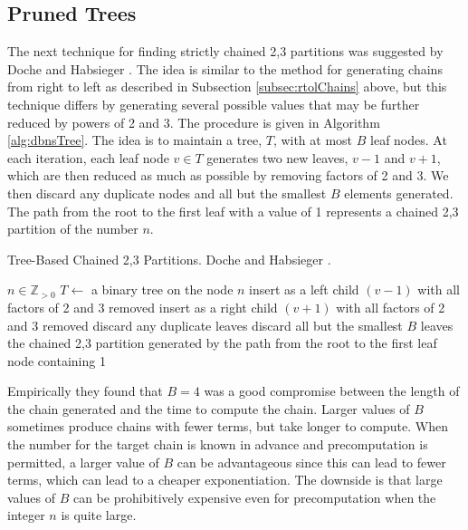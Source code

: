 \documentclass{ucalgthes1}
\theoremstyle{definition}
\newcommand{\ZZgtz}{\mathbb{Z}_{>0}}
\begin{document}
\bigbreak
\subsection{Pruned Trees}

The next technique for finding strictly chained 2,3 partitions was suggested by Doche and Habsieger \cite{Doche2008}. The idea is similar to the method for generating chains from right to left as described in Subsection \ref{subsec:rtolChains} above, but this technique differs by generating several possible values that may be further reduced by powers of 2 and 3. The procedure is given in Algorithm \ref{alg:dbnsTree}.  The idea is to maintain a tree, $T$, with at most $B$ leaf nodes. At each iteration, each leaf node $v \in T$ generates two new leaves, $v-1$ and $v+1$, which are then reduced as much as possible by removing factors of 2 and 3.  We then discard any duplicate nodes and all but the smallest $B$ elements generated. The path from the root to the first leaf with a value of 1 represents a chained 2,3 partition of the number $n$.

\begin{algorithm}[h]
\caption{Tree-Based Chained 2,3 Partitions. Doche and Habsieger \cite{Doche2008}.}
\label{alg:dbnsTree}
\begin{algorithmic}[1]
\REQUIRE $n \in \ZZgtz$
\STATE $T \gets$ a binary tree on the node $n$
		\STATE insert as a left child $(v - 1)$ with all factors of 2 and 3 removed
		\STATE insert as a right child $(v + 1)$ with all factors of 2 and 3 removed
	\ENDFOR
	\STATE discard any duplicate leaves
	\STATE discard all but the smallest $B$ leaves
\ENDWHILE
\RETURN the chained 2,3 partition generated by the path from the root to the first leaf node containing 1
\end{algorithmic}
\end{algorithm}

Empirically they found that $B=4$ was a good compromise between the length of the chain generated and the time to compute the chain. Larger values of $B$ sometimes produce chains with fewer terms, but take longer to compute. When the number for the target chain is known in advance and precomputation is permitted, a larger value of $B$ can be advantageous since this can lead to fewer terms, which can lead to a cheaper exponentiation.  The downside is that large values of $B$ can be prohibitively expensive even for precomputation when the integer $n$ is quite large.
\end{document}
